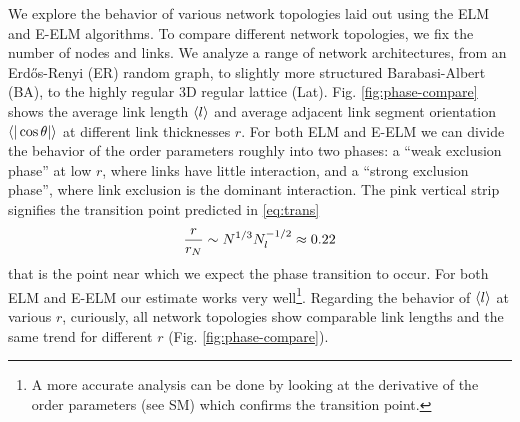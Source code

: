 \documentclass[nofootinbib,preprint,floatfix,endfloats]{revtex4} %
\begin{document}

We explore the behavior of various network topologies laid out using the ELM and E-ELM algorithms. 
To compare different network topologies, we fix the number of nodes and links. 
We analyze a range of network architectures, from an Erdős-Renyi (ER) random graph, to slightly more structured Barabasi-Albert (BA), 
to the highly regular 3D regular lattice (Lat).
Fig. \ref{fig:phase-compare} shows the average link length $\left<l\right>$ and average adjacent link segment orientation $\be{|\cos\theta|}$ at different link thicknesses $r$. 
For both ELM and E-ELM we can divide the behavior of the order parameters roughly into two phases: a ``weak exclusion phase'' at low $r$, where links have little interaction, and a ``strong exclusion phase'', where link exclusion is the dominant interaction. The pink vertical strip signifies the transition point predicted in \eqref{eq:trans} 
\[{r\over r_N} \sim N^{1/3} N_l^{-1/2}\approx 0.22\]
that is the point near which we expect the phase transition to occur. 
For both ELM and E-ELM our estimate works very well\footnote{A more accurate analysis can be done by looking at the derivative of the order parameters (see SM) which confirms the transition point.}. 
Regarding the behavior of $\left<l\right>$ at various $r$, curiously, all network topologies show comparable link lengths and the same trend for different $r$ (Fig. \ref{fig:phase-compare}).
\end{document}
